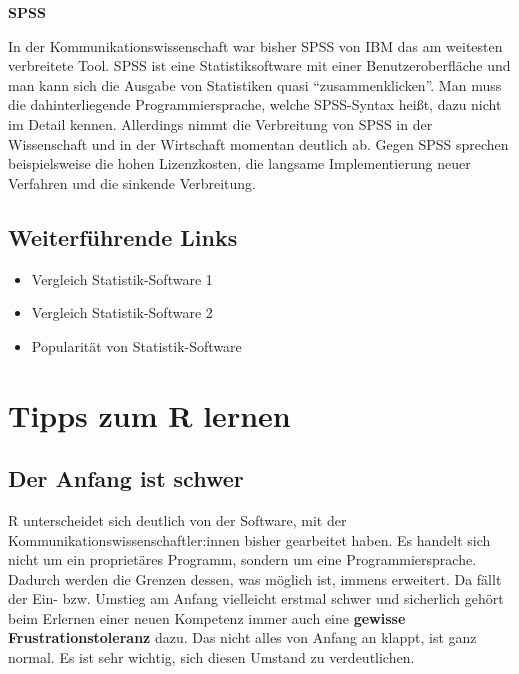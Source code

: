 \documentclass[
]{book}
\providecommand{\tightlist}{%
  \setlength{\itemsep}{0pt}\setlength{\parskip}{0pt}}
\begin{document}
\leavevmode\hypertarget{info_spss}{}%
\textbf{SPSS}

In der Kommunikationswissenschaft war bisher SPSS von IBM das am weitesten verbreitete Tool.
SPSS ist eine Statistiksoftware mit einer Benutzeroberfläche und man kann sich die Ausgabe von Statistiken quasi ``zusammenklicken''.
Man muss die dahinterliegende Programmiersprache, welche SPSS-Syntax heißt, dazu nicht im Detail kennen.
Allerdings nimmt die Verbreitung von SPSS in der Wissenschaft und in der Wirtschaft momentan
deutlich ab.
Gegen SPSS sprechen beispielsweise die hohen Lizenzkosten, die langsame Implementierung neuer Verfahren und die sinkende Verbreitung.

\hypertarget{weiterfuxfchrende-links-1}{%
\subsection*{Weiterführende Links}\label{weiterfuxfchrende-links-1}}

\begin{itemize}
\tightlist
\item
  Vergleich Statistik-Software 1
\item
  Vergleich Statistik-Software 2
\item
  Popularität von Statistik-Software
\end{itemize}

\hypertarget{tipps-zum-r-lernen}{%
\section{Tipps zum R lernen}\label{tipps-zum-r-lernen}}

\hypertarget{der-anfang-ist-schwer}{%
\subsection{Der Anfang ist schwer}\label{der-anfang-ist-schwer}}

R unterscheidet sich deutlich von der Software, mit der Kommunikationswissenschaftler:innen bisher gearbeitet haben. Es handelt sich nicht um ein proprietäres Programm, sondern um eine Programmiersprache. Dadurch werden die Grenzen dessen, was möglich ist, immens erweitert. Da fällt der Ein- bzw. Umstieg am Anfang vielleicht erstmal schwer und sicherlich gehört beim Erlernen einer neuen Kompetenz immer auch eine \textbf{gewisse Frustrationstoleranz} dazu. Das nicht alles von Anfang an klappt, ist ganz normal. Es ist sehr wichtig, sich diesen Umstand zu verdeutlichen.
\end{document}
